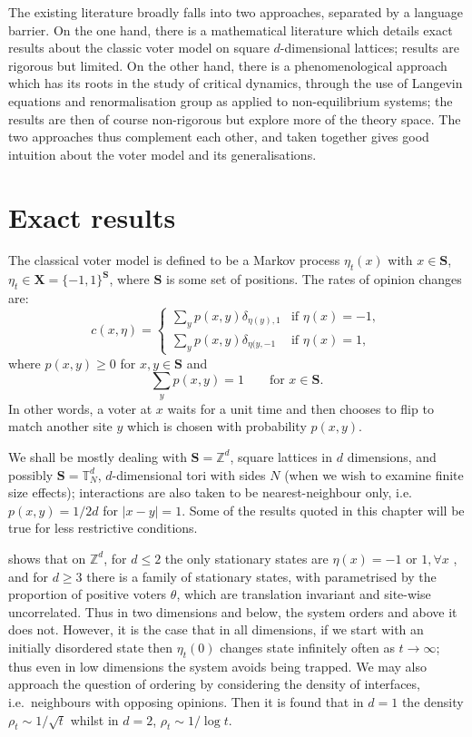 \documentclass[10pt,english]{report}
\begin{document}
The existing literature broadly falls into two approaches, separated by a language barrier. On the one hand, there is a mathematical literature which details exact results about the classic voter model on square $d$-dimensional lattices; results are rigorous but limited. On the other hand, there is a phenomenological approach which has its roots in the study of critical dynamics, through the use of Langevin equations and renormalisation group as applied to non-equilibrium systems; the results are then of course non-rigorous but explore more of the theory space. The two approaches thus complement each other, and taken together gives good intuition about the voter model and its generalisations.

\section{Exact results}

The classical voter model \citep{voter1,voter2} is defined to be a Markov process $\eta_t(x)$ with $x \in \mathbf S$, $\eta_t \in \mathbf X=\{-1,1\}^\mathbf{S}$, where $\mathbf S$ is some set of positions. The rates of opinion changes are:
\begin{equation*}
c(x, \eta) = \begin{cases}
\sum_y p(x,y) \delta_{\eta(y),1} & \textrm{if $\eta(x) = -1$}, \\
\sum_y p(x,y) \delta_{\eta(y,-1} & \textrm{if $\eta(x) = 1$},
\end{cases}
\end{equation*}
where $p(x,y) \ge 0$ for $x,y \in \mathbf{S}$ and $$\sum_y p(x,y) = 1 \qquad \textrm{for $x \in \mathbf{S}$}.$$ In other words, a voter at $x$ waits for a unit time and then chooses to flip to match another site $y$ which is chosen with probability $p(x,y)$.

We shall be mostly dealing with $\mathbf S = \mathbb{Z}^d$, square lattices in $d$ dimensions, and possibly $\mathbf S = \mathbb{T}_N^d$, $d$-dimensional tori with sides $N$ (when we wish to examine finite size effects); interactions are also taken to be nearest-neighbour only, i.e.\ $p(x,y) = 1/2d$ for $\left| x - y \right| = 1$. Some of the results quoted in this chapter will be true for less restrictive conditions.

\citet{liggettbook} shows that on $\mathbb{Z}^d$, for $d \le 2$ the only stationary states are $\eta(x) = -1\textrm{ or }1, \forall x$ , and for $d \ge 3$ there is a family of stationary states, with parametrised by the proportion of positive voters $\theta$, which are translation invariant and site-wise uncorrelated. Thus in two dimensions and below, the system orders and above it does not.  However, it is the case that in all dimensions, if we start with an initially disordered state then $\eta_t(0)$ changes state infinitely often as $t \rightarrow \infty$; thus even in low dimensions the system avoids being trapped. We may also approach the question of ordering by considering the density of interfaces, i.e.\ neighbours with opposing opinions. Then it is found that in $d=1$ the density $\rho_t \sim 1/\sqrt{t}$ whilst in $d=2$, $\rho_t \sim 1/\log t$. 
\end{document}
